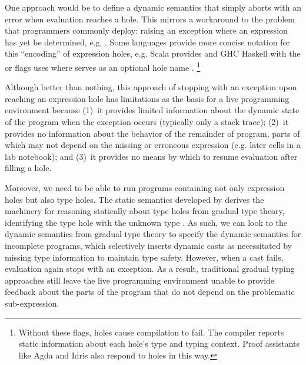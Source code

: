 One approach would be to define a dynamic semantics that simply aborts with an error when evaluation reaches a hole. 
%
This mirrors a workaround to the problem that programmers commonly deploy: 
raising an exception where an expression has yet be determined, e.g. . 
Some languages provide more concise notation for this ``encoding'' of expression holes, 
e.g. Scala provides   
and GHC Haskell with the  or  flags uses 
where  serves as an
optional hole name \cite{GHCHoles}.%
\footnote{Without these flags, holes cause compilation to fail. The compiler reports static information about each hole's type and typing context. 
Proof assistants like Agda \cite{norell:thesis,norell2009dependently} and Idris \cite{brady2013idris} also respond to holes in this way.}

Although better than nothing, this approach of stopping with an exception upon reaching an expression hole has limitations 
as the basis for a live programming environment because 
(1)~it provides limited information about the dynamic state of the program when the exception occurs
(typically only a stack trace);  
(2)~it provides no information about the behavior of the remainder of program, 
parts of which may not depend on the missing or erroneous expression (e.g. later cells in a lab notebook); and 
(3)~it provides no means by which to resume evaluation after filling a hole.

Moreover, we need to be able to run programs containing not only expression holes but also type holes.
The static semantics developed by \citet{popl-paper} derives the machinery for 
reasoning statically about type holes from gradual type theory, 
identifying the type hole with the unknown type \cite{DBLP:conf/snapl/SiekVCB15,Siek06a}.
%
As such, we can look to the dynamic semantics from
gradual type theory to specify the dynamic semantics for incomplete programs,
which selectively inserts dynamic casts as necessitated by missing type information to maintain type safety. 
However, when a cast fails, evaluation again stops with 
an exception.
%
As a result, traditional gradual typing approaches still leave the live programming environment unable to provide feedback about the parts 
of the program that do not depend on the problematic sub-expression.


